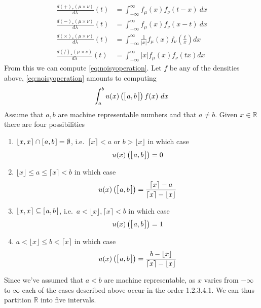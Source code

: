 \documentclass[10pt,a4paper]{article}
\theoremstyle{plain}
\theoremstyle{definition}
\newcommand{\R}{\mathbb{R}}
\newcommand{\ceil}[1]{\lceil #1 \rceil}
\newcommand{\floor}[1]{\lfloor #1 \rfloor}
\newcommand{\intvl}[1]{\mathlarger{\left[\right.}  #1 \mathlarger{\left.\right]}}
\newcommand{\fintvl}[1][x]{\mathlarger{\lfloor}#1,#1\mathlarger{\rceil}}
\newcommand{\absv}[1]{\vert #1\vert}
\begin{document}
\begin{align}
\frac{d(+)_\ast(\mu\times\nu)}{d\lambda}(t)&=\int_{-\infty}^{\infty} f_\mu(x)f_\nu(t-x)~dx\label{eq:pdfplus}\\
\frac{d(-)_\ast(\mu\times\nu)}{d\lambda}(t)&=\int_{-\infty}^{\infty} f_\mu(x)f_\nu(x-t)~dx\label{eq:pdfminus}\\
\frac{d(\times)_\ast(\mu\times\nu)}{d\lambda}(t)&=\int_{-\infty}^{\infty} \frac{1}{\absv{x}}f_\mu(x)f_\nu\left(\frac{t}{x}\right)dx\label{eq:pdftimes}\\
\frac{d(/)_\ast(\mu\times\nu)}{d\lambda}(t)&=\int_{-\infty}^{\infty} \absv{x}f_\mu(x)f_\nu(tx)dx\label{eq:pdfdiv}
\end{align}
From this we can compute \eqref{eq:noisyoperation}. Let $f$ be any of the densities above, \eqref{eq:noisyoperation} amounts to computing
\[
\int_a^b u(x)\left(\intvl{a,b}\right) f(x) ~dx
\]
Assume that $a,b$ are machine representable numbers and that $a\neq b$. Given $x\in \R$ there are four possibilities
\begin{enumerate}
\item $\fintvl \cap \intvl{a,b}=\emptyset$, i.e.\ $\ceil{x}<a$ or $b>\floor{x}$ in which case 
\[
u(x)\left(\intvl{a,b}\right)=0
\]
\item  $\floor{x}\leq a\leq \ceil{x}<b$ in which case
\[
u(x)\left(\intvl{a,b}\right)=\frac{\ceil{x}-a}{\ceil{x}-\floor{x}}
\]
\item $\fintvl \subseteq \intvl{a,b}$, i.e.\ $a<\floor{x}, \ceil{x}<b$ in which case
\[
u(x)\left(\intvl{a,b}\right)=1
\]
\item  $a< \floor{x}\leq b<\ceil{x}$ in which case
\[
u(x)\left(\intvl{a,b}\right)=\frac{b-\floor{x}}{\ceil{x}-\floor{x}}
\]
\end{enumerate}
Since we've assumed that $a<b$ are machine representable, as $x$ varies from $-\infty$ to $\infty$ each of the cases described above occur in the order 1.2.3.4.1. We can thus partition $\R$ into five intervals. 
\end{document}
